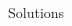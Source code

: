 {\begin{frame}{Solutions}
\begin{columns}
\begin{column}{0.2\textwidth}
			\end{column}
		\end{columns}

	\end{frame}
}

